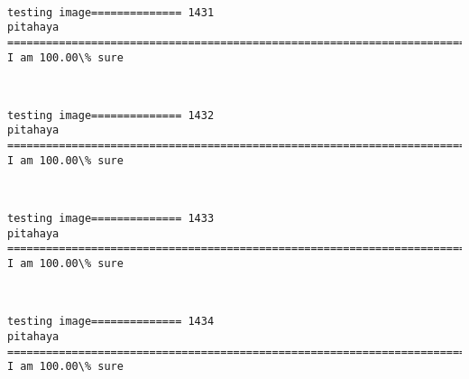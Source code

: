 \documentclass[11pt]{article}
\begin{document}
    \begin{center}
    \end{center}
    { \hspace*{\fill} \\}
    
    \begin{Verbatim}[commandchars=\\\{\}]
testing image============== 1431
pitahaya
============================================================================
I am 100.00\% sure

    \end{Verbatim}

    \begin{center}
    \end{center}
    { \hspace*{\fill} \\}
    
    \begin{Verbatim}[commandchars=\\\{\}]
testing image============== 1432
pitahaya
============================================================================
I am 100.00\% sure

    \end{Verbatim}

    \begin{center}
    \end{center}
    { \hspace*{\fill} \\}
    
    \begin{Verbatim}[commandchars=\\\{\}]
testing image============== 1433
pitahaya
============================================================================
I am 100.00\% sure

    \end{Verbatim}

    \begin{center}
    \end{center}
    { \hspace*{\fill} \\}
    
    \begin{Verbatim}[commandchars=\\\{\}]
testing image============== 1434
pitahaya
============================================================================
I am 100.00\% sure

    \end{Verbatim}
\end{document}
